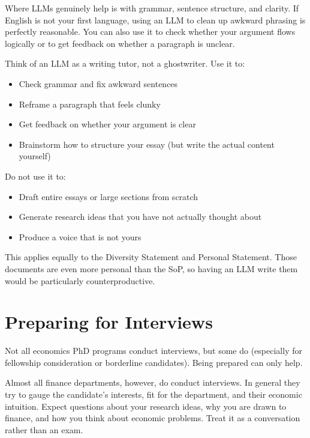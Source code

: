 \documentclass[11pt, letterpaper]{article}
\begin{document}
Where LLMs genuinely help is with grammar, sentence structure, and clarity. If English is not your first language, using an LLM to clean up awkward phrasing is perfectly reasonable. You can also use it to check whether your argument flows logically or to get feedback on whether a paragraph is unclear.

\begin{tipbox}
Think of an LLM as a writing tutor, not a ghostwriter. Use it to:
\begin{itemize}[leftmargin=*, itemsep=2pt]
    \item Check grammar and fix awkward sentences
    \item Reframe a paragraph that feels clunky
    \item Get feedback on whether your argument is clear
    \item Brainstorm how to structure your essay (but write the actual content yourself)
\end{itemize}
Do not use it to:
\begin{itemize}[leftmargin=*, itemsep=2pt]
    \item Draft entire essays or large sections from scratch
    \item Generate research ideas that you have not actually thought about
    \item Produce a voice that is not yours
\end{itemize}
\end{tipbox}

This applies equally to the Diversity Statement and Personal Statement. Those documents are even more personal than the SoP, so having an LLM write them would be particularly counterproductive.

\newpage
\section{Preparing for Interviews}\label{sec:interviews}

Not all economics PhD programs conduct interviews, but some do (especially for fellowship consideration or borderline candidates). Being prepared can only help.

Almost all finance departments, however, do conduct interviews. In general they try to gauge the candidate's interests, fit for the department, and their economic intuition. Expect questions about your research ideas, why you are drawn to finance, and how you think about economic problems. Treat it as a conversation rather than an exam.
\end{document}
